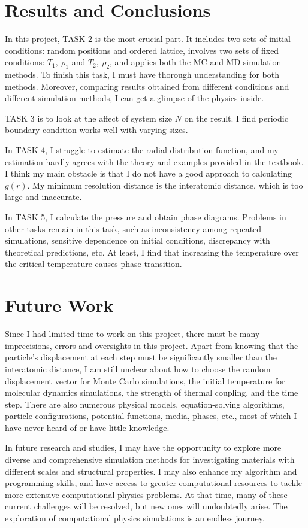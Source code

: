 \documentclass[letterpaper,12pt]{article}
\numberwithin{equation}{section}
\begin{document}
\section{Results and Conclusions}

In this project, TASK 2 is the most crucial part. It includes two sets of initial conditions: random positions and ordered lattice, involves two sets of fixed conditions: $T_1,\ \rho_1$ and $T_2,\ \rho_2$, and applies both the MC and MD simulation methods. To finish this task, I must have thorough understanding for both methods. Moreover, comparing results obtained from different conditions and different simulation methods, I can get a glimpse of the physics inside. 

TASK 3 is to look at the affect of system size $N$ on the result. I find periodic boundary condition works well with varying sizes. 

In TASK 4, I struggle to estimate the radial distribution function, and my estimation hardly agrees with the theory and examples provided in the textbook. I think my main obstacle is that I do not have a good approach to calculating $g(r)$. My minimum resolution distance is the interatomic distance, which is too large and inaccurate. 

In TASK 5, I calculate the pressure and obtain phase diagrams. Problems in other tasks remain in this task, such as inconsistency among repeated simulations, sensitive dependence on initial conditions, discrepancy with theoretical predictions, etc. At least, I find that increasing the temperature over the critical temperature causes phase transition. 

\section{Future Work}
Since I had limited time to work on this project, there must be many imprecisions, errors and oversights in this project. Apart from knowing that the particle's displacement at each step must be significantly smaller than the interatomic distance, I am still unclear about how to choose the random displacement vector for Monte Carlo simulations, the initial temperature for molecular dynamics simulations, the strength of thermal coupling, and the time step. There are also numerous physical models, equation-solving algorithms, particle configurations, potential functions, media, phases, etc., most of which I have never heard of or have little knowledge. 

In future research and studies, I may have the opportunity to explore more diverse and comprehensive simulation methods for investigating materials with different scales and structural properties. I may also enhance my algorithm and programming skills, and have access to greater computational resources to tackle more extensive computational physics problems. At that time, many of these current challenges will be resolved, but new ones will undoubtedly arise. The exploration of computational physics simulations is an endless journey.
\end{document}
